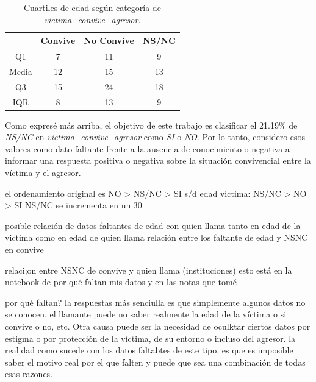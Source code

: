 \documentclass[10 pt]{article}
\begin{document}
\begin{table}[H]
    \begin{center}
    \caption{Cuartiles de edad según categoría de \textit{victima\_convive\_agresor}.}
    \label{cuartilesconviveedad}
    \begin{tabular}{cccc}
    \hline
    \multicolumn{1}{r}{\textbf{}} & \textbf{Convive} & \textbf{No Convive} & \textbf{ NS/NC} \\ \hline
    Q1                            & 7                    & 11                   & 9                       \\
    Media                         & 12                   & 15                   & 13                      \\
    Q3                            & 15                   & 24                   & 18                      \\
    IQR                           & 8                   & 13                   & 9                     \\ \hline
    \end{tabular}
    \end{center}
    \end{table}





Como expresé más arriba, el objetivo de este trabajo es clasificar el 21.19\% de \textit{NS/NC} en \textit{victima\_convive\_agresor} como \textit{SI} o \textit{NO}. Por lo tanto, considero esos valores como dato faltante frente a la ausencia de conocimiento o negativa a informar una respuesta positiva o negativa sobre la situación convivencial entre la víctima y el agresor.

el ordenamiento original es NO > NS/NC > SI
s/d edad victima: NS/NC > NO > SI NS/NC se incrementa en un 30%


posible relación de datos faltantes de edad con quien llama tanto en edad de la victima como en edad de quien llama
relación entre los faltante de edad y NSNC en convive

relaci;on entre NSNC de convive y quien llama (instituciones) esto está en la notebook de por qué faltan mis datos y en las notas que tomé

por qué faltan? la respuestas más senciulla es que simplemente algunos datos no se conocen, el llamante puede no saber realmente la edad de la víctima o si convive o no, etc. Otra causa puede ser la necesidad de oculktar ciertos datos por estigma o por protección de la víctima, de su entorno o incluso del agresor. la realidad como sucede con los datos faltabtes de este tipo, es que es imposible saber el motivo real por el que falten y puede que sea una combinación de todas esas razones.
\end{document}

